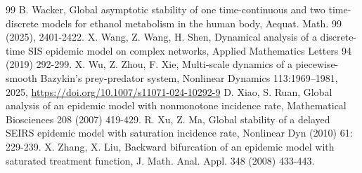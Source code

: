 \documentclass[12pt]{article}
\theoremstyle{definition}
\theoremstyle{remark}
\numberwithin{equation}{section}
\begin{document}
\begin{thebibliography}{99}
B. Wacker, Global asymptotic stability of one time-continuous and two
time-discrete models for ethanol metabolism in the human body, Aequat. Math. 99 (2025), 2401-2422.
X. Wang, Z. Wang, H. Shen, Dynamical analysis of a discrete-time SIS
epidemic model on complex networks, Applied Mathematics Letters 94
(2019) 292-299.
X. Wu, Z. Zhou, F. Xie, Multi-scale dynamics of a piecewise-smooth Bazykin's prey-predator system, Nonlinear Dynamics 113:1969--1981, 2025, \url{https://doi.org/10.1007/s11071-024-10292-9}
D. Xiao, S. Ruan, Global analysis of an epidemic model
with nonmonotone incidence rate, Mathematical Biosciences 208 (2007) 419-429.
R. Xu, Z. Ma, Global stability of a delayed SEIRS epidemic model
with saturation incidence rate, Nonlinear Dyn (2010) 61: 229-239.
X. Zhang, X. Liu, Backward bifurcation of an epidemic model with saturated treatment
function, J. Math. Anal. Appl. 348 (2008) 433-443.
























\end{thebibliography}
\end{document}
